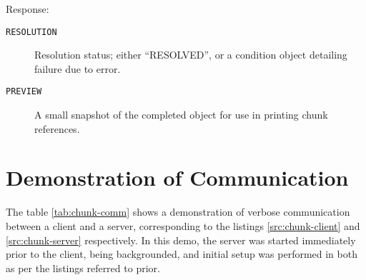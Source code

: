 \documentclass[a4paper,10pt]{article}
\begin{document}
Response:
\begin{description}
	\item[\texttt{RESOLUTION}] Resolution status; either ``RESOLVED'', or a
		condition object detailing failure due to error.
	\item[\texttt{PREVIEW}]  A small snapshot of the completed object for
		use in printing chunk references.
\end{description}

\section{Demonstration of Communication}

The table \ref{tab:chunk-comm} shows a demonstration of verbose communication
between a client and a server, corresponding to the listings
\ref{src:chunk-client} and \ref{src:chunk-server} respectively.
In this demo, the server was started immediately prior to the client, being
backgrounded, and initial setup was performed in both as per the listings
referred to prior.
\end{document}
